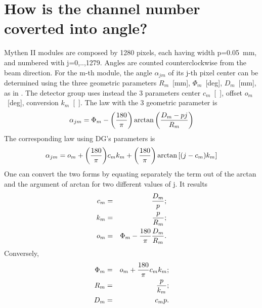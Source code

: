 

\section{How is the channel number coverted into angle?}\label{sec:angcal}



Mythen II modules are composed by 1280 pixels, each having width p=0.05~mm, and numbered with j=0,..,1279. 
Angles are counted counterclockwise from the beam direction. For the m-th module, the angle $\alpha_{jm}$ of its j-th pixel center 
can be determined using the three geometric parameters $R_m$~[mm], $\Phi_m$~[deg], $D_m$~[mm], as in . 
The detector group uses instead the 3 parameters center $c_m$~[\ ], offset $o_m$~[deg], conversion $k_m$~[\ ]. 
The law with the 3 geometric parameter is
\begin{equation}
\alpha_{jm}=\Phi_m-\lrb{\DSF{180}{\pi}}\arctan\lrb{\DSF{D_m-pj}{R_m}}
\end{equation}
The corresponding law using DG's parameters is
\begin{equation}
\alpha_{jm}=o_m+\lrb{\DSF{180}{\pi}}c_mk_m+\lrb{\DSF{180}{\pi}}\arctan\lrs{\lrb{j-c_m}k_m}
\end{equation}
One can convert the two forms by equating separately the term out of the arctan and the argument of arctan for two different values of j. 
It results
\begin{eqnarray}
c_m&=&\DSF{D_m}{p};\\ 
k_m&=&\DSF{p}{R_m};\\ 
o_m&=&\Phi_m-\DSF{180}{\pi}\DSF{D_m}{R_m}.
\end{eqnarray}
Conversely,
\begin{eqnarray}
\Phi_m&=&o_m+\DSF{180}{\pi}c_mk_m;\\
R_m&=&\DSF{p}{k_m};\\
D_m&=&c_m p.
\end{eqnarray}

